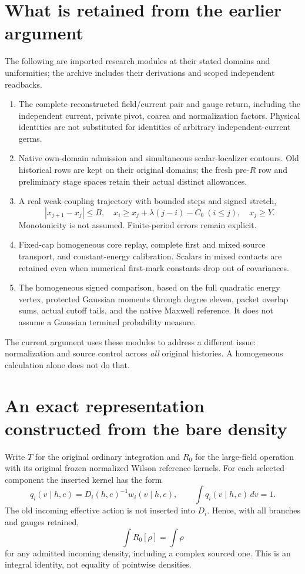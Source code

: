 \documentclass[11pt]{article}
\theoremstyle{definition}\newtheorem{definition}[theorem]{Definition}
\theoremstyle{remark}\newtheorem{remark}[theorem]{Remark}
\begin{document}
\section{What is retained from the earlier argument}
The following are imported research modules at their stated domains and uniformities; the archive includes their derivations and scoped independent readbacks.
\begin{enumerate}
\item The complete reconstructed field/current pair and gauge return, including the independent current, private pivot, coarea and normalization factors. Physical identities are not substituted for identities of arbitrary independent-current germs.
\item Native own-domain admission and simultaneous scalar-localizer contours. Old historical rows are kept on their original domains; the fresh pre-$R$ row and preliminary stage spaces retain their actual distinct allowances.
\item A real weak-coupling trajectory with bounded steps and signed stretch,
\[
 |x_{j+1}-x_j|\leq B,\quad x_i\geq x_j+\lambda(j-i)-C_0\ (i\leq j),\quad x_j\geq Y.
\]
Monotonicity is not assumed. Finite-period errors remain explicit.
\item Fixed-cap homogeneous core replay, complete first and mixed source transport, and constant-energy calibration. Scalars in mixed contacts are retained even when numerical first-mark constants drop out of covariances.
\item The homogeneous signed comparison, based on the full quadratic energy vertex, protected Gaussian moments through degree eleven, packet overlap sums, actual cutoff tails, and the native Maxwell reference. It does not assume a Gaussian terminal probability measure.
\end{enumerate}
The current argument uses these modules to address a different issue: normalization and source control across \emph{all} original histories. A homogeneous calculation alone does not do that.

\section{An exact representation constructed from the bare density}
Write $T$ for the original ordinary integration and $R_0$ for the large-field operation with its original frozen normalized Wilson reference kernels. For each selected component the inserted kernel has the form
\[
 q_i(v\mid h,e)=D_i(h,e)^{-1}w_i(v\mid h,e),\qquad \int q_i(v\mid h,e)\,dv=1.
\]
The old incoming effective action is not inserted into $D_i$. Hence, with all branches and gauges retained,
\begin{equation}
 \int R_0[\rho]=\int\rho \label{masspreserving}
\end{equation}
for any admitted incoming density, including a complex sourced one. This is an integral identity, not equality of pointwise densities.
\end{document}
